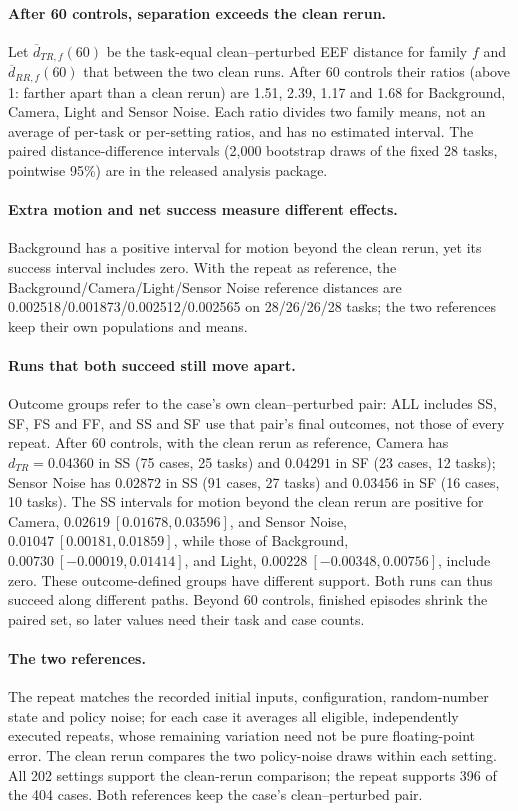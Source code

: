 \paragraph{After 60 controls, separation exceeds the clean rerun.}
Let $\overline d_{TR,f}(60)$ be the task-equal clean--perturbed EEF distance for family $f$ and $\overline d_{RR,f}(60)$ that between the two clean runs. After 60 controls their ratios (above 1: farther apart than a clean rerun) are 1.51, 2.39, 1.17 and 1.68 for Background, Camera, Light and Sensor Noise. Each ratio divides two family means, not an average of per-task or per-setting ratios, and has no estimated interval. The paired distance-difference intervals (2,000 bootstrap draws of the fixed 28 tasks, pointwise 95\%) are in the released analysis package.

\paragraph{Extra motion and net success measure different effects.}
Background has a positive interval for motion beyond the clean rerun, yet its success interval includes zero. With the repeat as reference, the Background/Camera/Light/Sensor Noise reference distances are 0.002518/0.001873/0.002512/0.002565 on 28/26/26/28 tasks; the two references keep their own populations and means.

\paragraph{Runs that both succeed still move apart.}
Outcome groups refer to the case's own clean--perturbed pair: ALL includes SS, SF, FS and FF, and SS and SF use that pair's final outcomes, not those of every repeat. After 60 controls, with the clean rerun as reference, Camera has $d_{TR}=0.04360$ in SS (75 cases, 25 tasks) and $0.04291$ in SF (23 cases, 12 tasks); Sensor Noise has $0.02872$ in SS (91 cases, 27 tasks) and $0.03456$ in SF (16 cases, 10 tasks). The SS intervals for motion beyond the clean rerun are positive for Camera, $0.02619\ [0.01678,0.03596]$, and Sensor Noise, $0.01047\ [0.00181,0.01859]$, while those of Background, $0.00730\ [-0.00019,0.01414]$, and Light, $0.00228\ [-0.00348,0.00756]$, include zero. These outcome-defined groups have different support. Both runs can thus succeed along different paths. Beyond 60 controls, finished episodes shrink the paired set, so later values need their task and case counts.

\paragraph{The two references.}
The repeat matches the recorded initial inputs, configuration, random-number state and policy noise; for each case it averages all eligible, independently executed repeats, whose remaining variation need not be pure floating-point error. The clean rerun compares the two policy-noise draws within each setting. All 202 settings support the clean-rerun comparison; the repeat supports 396 of the 404 cases. Both references keep the case's clean--perturbed pair.

